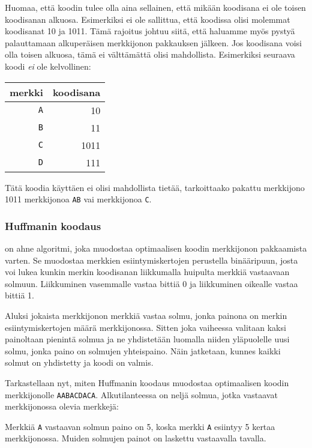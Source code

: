 Huomaa, että koodin tulee olla aina sellainen,
että mikään koodisana ei ole toisen koodisanan
alkuosa.
Esimerkiksi ei ole sallittua, että koodissa
olisi molemmat koodisanat 10 ja 1011.
Tämä rajoitus johtuu siitä,
että haluamme myös pystyä palauttamaan
alkuperäisen merkkijonon pakkauksen jälkeen.
Jos koodisana voisi olla toisen alkuosa,
tämä ei välttämättä olisi mahdollista.
Esimerkiksi seuraava koodi
\emph{ei} ole kelvollinen:
\begin{center}
\begin{tabular}{rr}
merkki & koodisana \\
\hline
\texttt{A} & 10 \\
\texttt{B} & 11 \\
\texttt{C} & 1011 \\
\texttt{D} & 111 \\
\end{tabular}
\end{center}
Tätä koodia käyttäen ei olisi mahdollista tietää,
tarkoittaako pakattu merkkijono 1011
merkkijonoa \texttt{AB} vai merkkijonoa \texttt{C}.


\subsubsection{Huffmanin koodaus}

 on ahne algoritmi,
joka muodostaa optimaalisen koodin
merkkijonon pakkaamista varten.
Se muodostaa merkkien esiintymiskertojen
perustella binääripuun, josta voi lukea
kunkin merkin koodisanan
liikkumalla huipulta merkkiä vastaavaan solmuun.
Liikkuminen vasemmalle vastaa
bittiä 0 ja liikkuminen oikealle
vastaa bittiä 1.

Aluksi jokaista merkkijonon merkkiä vastaa solmu,
jonka painona on merkin esiintymiskertojen määrä merkkijonossa.
Sitten joka vaiheessa valitaan
kaksi painoltaan pienintä solmua
ja ne yhdistetään luomalla niiden
yläpuolelle uusi solmu,
jonka paino on solmujen yhteispaino.
Näin jatketaan, kunnes kaikki solmut
on yhdistetty ja koodi on valmis.

Tarkastellaan nyt, miten Huffmanin koodaus
muodostaa optimaalisen koodin merkkijonolle
\texttt{AABACDACA}.
Alkutilanteessa on neljä solmua,
jotka vastaavat merkkijonossa olevia merkkejä:

\begin{center}
\end{center}
Merkkiä \texttt{A} vastaavan solmun paino on
5, koska merkki \texttt{A} esiintyy 5 kertaa merkkijonossa.
Muiden solmujen painot on laskettu vastaavalla tavalla.

